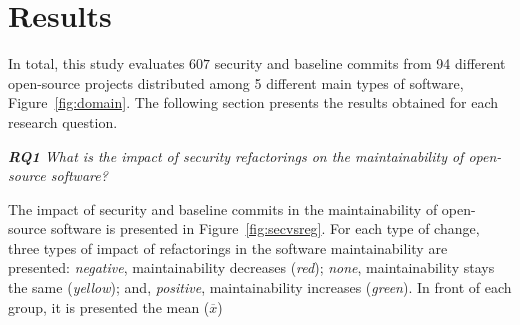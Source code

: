 \documentclass[10pt,conference]{IEEEtran}
\begin{document}
\section{Results}\label{sec:results}

In total, this study evaluates $607$ security and baseline commits from 94
different open-source projects distributed among 5 different main types of
software, Figure~\ref{fig:domain}. The following section presents the results
obtained for each research question.

\begin{framed}
\textit{\textbf{RQ1} What is the impact of security refactorings on the
maintainability of open-source software?}
\end{framed}


The impact of security and baseline commits in the maintainability of
open-source software is presented in Figure~\ref{fig:secvsreg}. For each type
of change, three types of impact of refactorings in the software maintainability
are presented: \emph{negative}, maintainability decreases (\emph{red}); \emph{none},
maintainability stays the same (\emph{yellow}); and, \emph{positive}, maintainability
increases (\emph{green}). In front of each group, it is presented the mean ($\overline{x}$)
\end{document}
